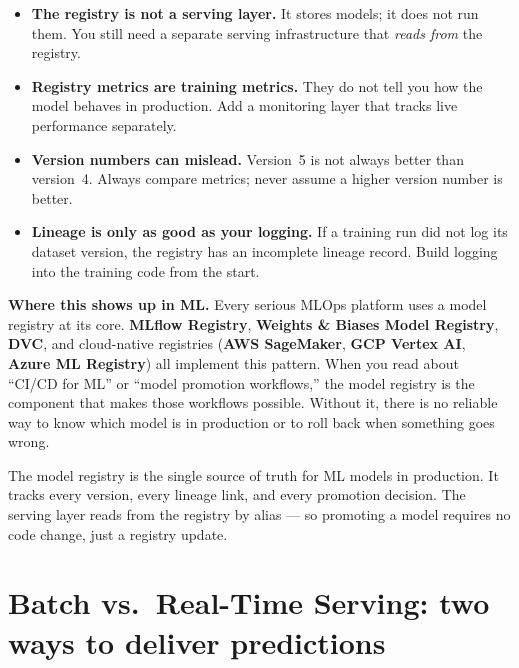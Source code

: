 \documentclass[a4paper,11pt]{article}
\begin{document}
\begin{watchout}
\begin{itemize}
  \item \textbf{The registry is not a serving layer.} It stores models; it
        does not run them. You still need a separate serving infrastructure
        that \emph{reads from} the registry.
  \item \textbf{Registry metrics are training metrics.}
        They do not tell you how the model behaves in production. Add a
        monitoring layer that tracks live performance separately.
  \item \textbf{Version numbers can mislead.}
        Version~5 is not always better than version~4. Always compare
        metrics; never assume a higher version number is better.
  \item \textbf{Lineage is only as good as your logging.}
        If a training run did not log its dataset version, the registry has
        an incomplete lineage record. Build logging into the training code
        from the start.
\end{itemize}
\end{watchout}

\noindent\textbf{Where this shows up in ML.}
Every serious MLOps platform uses a model registry at its core.
\textbf{MLflow Registry}, \textbf{Weights \& Biases Model Registry},
\textbf{DVC}, and cloud-native registries
(\textbf{AWS SageMaker}, \textbf{GCP Vertex AI}, \textbf{Azure ML Registry})
all implement this pattern. When you read about ``CI/CD for ML'' or
``model promotion workflows,'' the model registry is the component
that makes those workflows possible. Without it, there is no reliable way
to know which model is in production or to roll back when something goes wrong.

\begin{keytake}
The model registry is the single source of truth for ML models in production.
It tracks every version, every lineage link, and every promotion decision.
The serving layer reads from the registry by alias --- so promoting a model
requires no code change, just a registry update.
\end{keytake}

\section{Batch vs.\ Real-Time Serving: two ways to deliver predictions}
\end{document}
